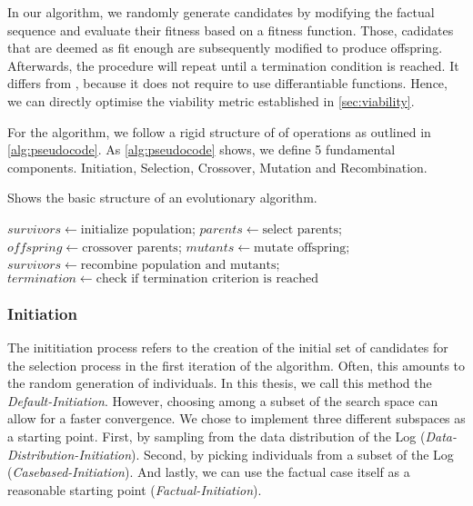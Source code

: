 \documentclass[./../../paper.tex]{subfiles}
\begin{document}
In our algorithm, we randomly generate candidates by modifying the factual sequence and evaluate their fitness based on a fitness function. Those, cadidates that are deemed as fit enough are subsequently modified to produce offspring. Afterwards, the procedure will repeat until a termination condition is reached. It differs from , because it does not require to use differantiable functions. Hence, we can directly optimise the viability metric established in \autoref{sec:viability}.

For the algorithm, we follow a rigid structure of of operations as outlined in \autoref{alg:pseudocode}. As \autoref{alg:pseudocode} shows, we define 5 fundamental components. Initiation, Selection, Crossover, Mutation and Recombination.

\begin{algorithm}[htb!]
    \label{alg:evolutionary}
    \caption{Shows the basic structure of an evolutionary algorithm.}
    \begin{algorithmic}
        \State $survivors \gets \text{initialize population}$;
        \State $parents \gets \text{select parents}$;
        \State $offspring \gets \text{crossover parents}$;
        \State $mutants \gets \text{mutate offspring}$;
        \State $survivors \gets \text{recombine population and mutants}$;
        \State $termination \gets \text{check if termination criterion is reached}$
        \EndWhile
    \end{algorithmic}
\end{algorithm}

\subsubsection{Initiation}
The inititiation process refers to the creation of the initial set of candidates for the selection process in the first iteration of the algorithm. Often, this amounts to the random generation of individuals. In this thesis, we call this method the \emph{Default-Initiation}. However, choosing among a subset of the search space can allow for a faster convergence. We chose to implement three different subspaces as a starting point. First, by sampling from the data distribution of the Log (\emph{Data-Distribution-Initiation}). Second, by picking individuals from a subset of the Log (\emph{Casebased-Initiation}). And lastly, we can use the factual case itself as a reasonable starting point (\emph{Factual-Initiation}).
\end{document}
